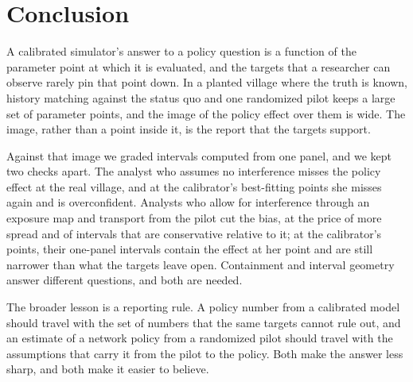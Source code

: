 \section{Conclusion}\label{sec:conclusion}

A calibrated simulator's answer to a policy question is a function of the
parameter point at which it is evaluated, and the targets that a researcher can
observe rarely pin that point down. In a planted village where the truth is known,
history matching against the status quo and one randomized pilot keeps a large set
of parameter points, and the image of the policy effect over them is wide. The
image, rather than a point inside it, is the report that the targets support.

Against that image we graded intervals computed from one panel, and we kept two
checks apart. The analyst who assumes no interference misses the policy effect at
the real village, and at the calibrator's best-fitting points she misses again and
is overconfident. Analysts who allow for interference through an exposure map and
transport from the pilot cut the bias, at the price of more spread and of intervals
that are conservative relative to it; at the calibrator's points, their one-panel
intervals contain the effect at her point and are still narrower than what the
targets leave open. Containment and interval geometry answer different questions,
and both are needed.

The broader lesson is a reporting rule. A policy number from a calibrated model
should travel with the set of numbers that the same targets cannot rule out, and
an estimate of a network policy from a randomized pilot should travel with the
assumptions that carry it from the pilot to the policy. Both make the answer less
sharp, and both make it easier to believe.
